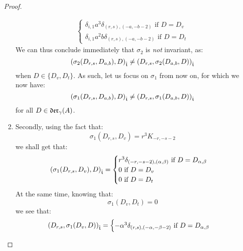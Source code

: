 \begin{proof}
\begin{enumerate}
$$\begin{aligned}
\begin{cases}
                                    \text{$\delta_{i, 1} a^3 \delta_{(r, s), (-a, -b - 2)}$ if $D = D_v$}
                                    \\
                                    \text{$\delta_{i, 1} a^2 b \delta_{(r, s), (-a, -b - 2)}$ if $D = D_t$}
                                \end{cases}
                            \end{aligned}
                        $$
                    We can thus conclude immediately that $\sigma_2$ is \textit{not} invariant, as:
                        $$\left( \sigma_2(D_{r, s}, D_{a, b}), D \right)_{\extendedtoroidal} \not = \left( D_{r, s}, \sigma_2(D_{a, b}, D) \right)_{\extendedtoroidal}$$
                    when $D \in \{D_v, D_t\}$. As such, let us focus on $\sigma_1$ from now on, for which we now have:
                        $$\left( \sigma_1(D_{r, s}, D_{a, b}), D \right)_{\extendedtoroidal} \not = \left( D_{r, s}, \sigma_1(D_{a, b}, D) \right)_{\extendedtoroidal}$$
                    for all $D \in \divzero$.
                    \item Secondly, using the fact that:
                        $$\sigma_1(D_{r, s}, D_v) = r^3 K_{-r, -s - 2}$$
                    we shall get that:
                        $$
                            \left( \sigma_1(D_{r, s}, D_v), D \right)_{\extendedtoroidal} =
                            \begin{cases}
                                \text{$r^3 \delta_{(-r, -s - 2), (\alpha, \beta)}$ if $D = D_{\alpha, \beta}$}
                                \\
                                \text{$0$ if $D = D_v$}
                                \\
                                \text{$0$ if $D = D_t$}
                            \end{cases}
                        $$
                    At the same time, knowing that:
                        $$\sigma_1(D_v, D_t) = 0$$
                    we see that:
                        $$
                            \begin{aligned}
                                \left( D_{r, s}, \sigma_1(D_v, D) \right)_{\extendedtoroidal} =
                                \begin{cases}
                                    \text{$-\alpha^3 \delta_{(r, s), (-\alpha, -\beta - 2)}$ if $D = D_{\alpha, \beta}$}
                                    \\

\end{cases}
\end{aligned}$$
\end{enumerate}
\end{proof}
